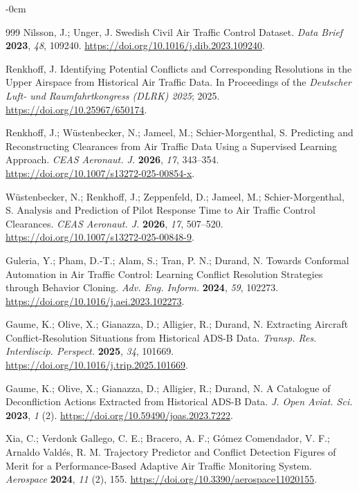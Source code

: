 \documentclass[aerospace,article,submit,moreauthors]{Definitions/mdpi}
\begin{document}
\begin{adjustwidth}{-\extralength}{0cm}
\begin{thebibliography}{999}
Nilsson, J.; Unger, J.
Swedish Civil Air Traffic Control Dataset.
{\em Data Brief}
{\bf 2023}, {\em 48}, 109240.
\url{https://doi.org/10.1016/j.dib.2023.109240}.

Renkhoff, J.
Identifying Potential Conflicts and Corresponding
Resolutions in the Upper Airspace from Historical
Air Traffic Data.
In Proceedings of the
{\em Deutscher Luft- und Raumfahrtkongress (DLRK) 2025};
2025.
\url{https://doi.org/10.25967/650174}.

Renkhoff, J.; W\"ustenbecker, N.;
Jameel, M.; Schier-Morgenthal, S.
Predicting and Reconstructing Clearances from
Air Traffic Data Using a Supervised Learning Approach.
{\em CEAS Aeronaut. J.}
{\bf 2026}, {\em 17}, 343--354.
\url{https://doi.org/10.1007/s13272-025-00854-x}.

W\"ustenbecker, N.; Renkhoff, J.;
Zeppenfeld, D.; Jameel, M.;
Schier-Morgenthal, S.
Analysis and Prediction of Pilot Response Time
to Air Traffic Control Clearances.
{\em CEAS Aeronaut. J.}
{\bf 2026}, {\em 17}, 507--520.
\url{https://doi.org/10.1007/s13272-025-00848-9}.

Guleria, Y.; Pham, D.-T.; Alam, S.;
Tran, P. N.; Durand, N.
Towards Conformal Automation in Air Traffic Control:
Learning Conflict Resolution Strategies through
Behavior Cloning.
{\em Adv. Eng. Inform.}
{\bf 2024}, {\em 59}, 102273.
\url{https://doi.org/10.1016/j.aei.2023.102273}.

Gaume, K.; Olive, X.; Gianazza, D.;
Alligier, R.; Durand, N.
Extracting Aircraft Conflict-Resolution Situations
from Historical ADS-B Data.
{\em Transp. Res. Interdiscip. Perspect.}
{\bf 2025}, {\em 34}, 101669.
\url{https://doi.org/10.1016/j.trip.2025.101669}.

Gaume, K.; Olive, X.; Gianazza, D.;
Alligier, R.; Durand, N.
A Catalogue of Deconfliction Actions Extracted
from Historical ADS-B Data.
{\em J. Open Aviat. Sci.}
{\bf 2023}, {\em 1} (2).
\url{https://doi.org/10.59490/joas.2023.7222}.

Xia, C.; Verdonk Gallego, C. E.;
Bracero, A. F.; G\'omez Comendador, V. F.;
Arnaldo Vald\'es, R. M.
Trajectory Predictor and Conflict Detection Figures
of Merit for a Performance-Based Adaptive
Air Traffic Monitoring System.
{\em Aerospace}
{\bf 2024}, {\em 11} (2), 155.
\url{https://doi.org/10.3390/aerospace11020155}.


\end{thebibliography}
\end{adjustwidth}
\end{document}
